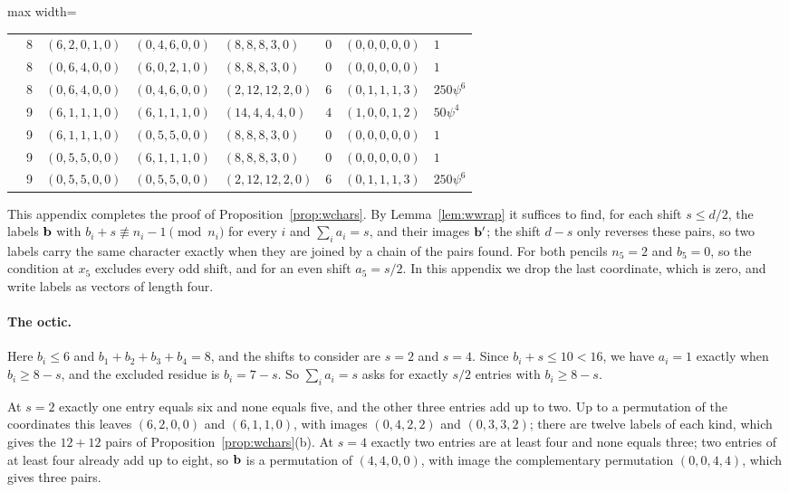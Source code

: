 \begin{table}[t]
\begin{adjustbox}{max width=\linewidth}
\begin{tabular}{lrlllrll}
 & 8 & $(6,2,0,1,0)$ & $(0,4,6,0,0)$ & $(8,8,8,3,0)$ & $0$ & $(0,0,0,0,0)$ & $1$\\
 & 8 & $(0,6,4,0,0)$ & $(6,0,2,1,0)$ & $(8,8,8,3,0)$ & $0$ & $(0,0,0,0,0)$ & $1$\\
 & 8 & $(0,6,4,0,0)$ & $(0,4,6,0,0)$ & $(2,12,12,2,0)$ & $6$ & $(0,1,1,1,3)$ & $250\psi^{6}$\\
 & 9 & $(6,1,1,1,0)$ & $(6,1,1,1,0)$ & $(14,4,4,4,0)$ & $4$ & $(1,0,0,1,2)$ & $50\psi^{4}$\\
 & 9 & $(6,1,1,1,0)$ & $(0,5,5,0,0)$ & $(8,8,8,3,0)$ & $0$ & $(0,0,0,0,0)$ & $1$\\
 & 9 & $(0,5,5,0,0)$ & $(6,1,1,1,0)$ & $(8,8,8,3,0)$ & $0$ & $(0,0,0,0,0)$ & $1$\\
 & 9 & $(0,5,5,0,0)$ & $(0,5,5,0,0)$ & $(2,12,12,2,0)$ & $6$ & $(0,1,1,1,3)$ & $250\psi^{6}$\\
\bottomrule
\end{tabular}\end{adjustbox}
\end{table}

This appendix completes the proof of Proposition~\ref{prop:wchars}. By
Lemma~\ref{lem:wwrap} it suffices to find, for each shift $s\le d/2$, the
labels $\mathbf{b}$ with $b_i+s\not\equiv n_i-1\pmod{n_i}$ for every $i$ and
$\sum_ia_i=s$, and their images $\mathbf{b}'$; the shift $d-s$ only reverses
these pairs, so two labels carry the same character exactly when they are
joined by a chain of the pairs found. For both pencils $n_5=2$ and
$b_5=0$, so the condition at $x_5$ excludes every odd shift, and for an
even shift $a_5=s/2$. In this appendix we drop the last coordinate, which
is zero, and write labels as vectors of length four.

\paragraph*{The octic.}
Here $b_i\le6$ and $b_1+b_2+b_3+b_4=8$, and the shifts to consider are
$s=2$ and $s=4$. Since $b_i+s\le10<16$, we have $a_i=1$ exactly when
$b_i\ge8-s$, and the excluded residue is $b_i=7-s$. So $\sum_ia_i=s$ asks
for exactly $s/2$ entries with $b_i\ge8-s$.

At $s=2$ exactly one entry equals six and none equals five, and the other
three entries add up to two. Up to a permutation of the coordinates this
leaves $(6,2,0,0)$ and $(6,1,1,0)$, with images $(0,4,2,2)$ and
$(0,3,3,2)$; there are twelve labels of each kind, which gives the $12+12$
pairs of Proposition~\ref{prop:wchars}(b). At $s=4$ exactly two entries are
at least four and none equals three; two entries of at least four already
add up to eight, so $\mathbf{b}$ is a permutation of $(4,4,0,0)$, with image the
complementary permutation $(0,0,4,4)$, which gives three pairs.

